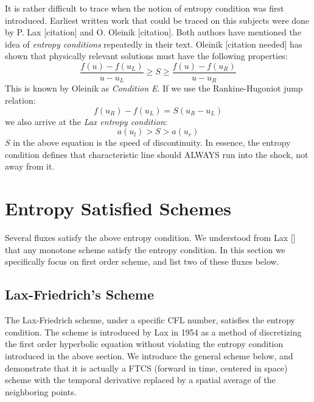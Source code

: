 \documentclass[a4paper]{article}
\numberwithin{equation}{section}
\begin{document}
It is rather difficult to trace when the notion of entropy condition was first introduced. Earliest written work that could be traced on this subjects were done by P. Lax [citation] and O. Oleinik [citation]. Both authors have mentioned the idea of \textit{entropy conditions} repeatedly in their text. Oleinik [citation needed] has shown that physically relevant solutions must have the following properties:
\begin{equation}
    \frac{f(u) - f(u_L)}{u-u_L} \geq S \geq \frac{f(u) - f(u_R)}{u-u_R}
\end{equation}
This is known by Oleinik as \textit{Condition E}. If we use the Rankine-Hugoniot jump relation:
\begin{equation}
    f(u_R) - f(u_L) = S(u_R - u_L)
\end{equation}
we also arrive at the \textit{Lax entropy condition}:
\begin{equation}
    a(u_l) > S > a(u_r)
\end{equation}
$S$ in the above equation is the speed of discontinuity. In essence, the entropy condition defines that characteristic line should ALWAYS run into the shock, not away from it. 

\section{Entropy Satisfied Schemes}
Several fluxes satisfy the above entropy condition. We understood from Lax [] that any monotone scheme satisfy the entropy condition. In this section we specifically focus on first order scheme, and list two of these fluxes below.

\subsection{Lax-Friedrich's Scheme}
The Lax-Friedrich scheme, under a specific CFL number, satisfies the entropy condition. The scheme is introduced by Lax in 1954 as a method of discretizing the first order hyperbolic equation without violating the entropy condition introduced in the above section. We introduce the general scheme below, and demonstrate that it is actually a FTCS (forward in time, centered in space) scheme with the temporal derivative replaced by a spatial average of the neighboring points. 
\end{document}
